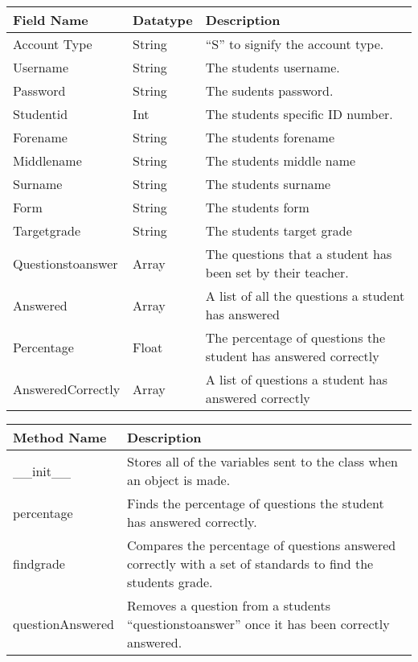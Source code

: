 \documentclass[letterpaper]{article}
\title{}
\author{}
\date{2015-03-30}
\begin{document}
\begin{center}
\tablefirsthead{}
\tablehead{}
\tabletail{}
\tablelasttail{}
\begin{supertabular}{|m{1.8in}|m{1.22956in}|m{2.42956in}|}
\hline
Field Name &
Datatype &
Description\\\hline
Account Type &
String &
{}``S'' to signify the account type.\\\hline
Username &
String &
The students username.\\\hline
Password &
String &
The sudents password.\\\hline
Studentid &
Int &
The students specific ID number.\\\hline
Forename &
String &
The students forename\\\hline
Middlename &
String &
The students middle name\\\hline
Surname &
String &
The students surname \\\hline
Form &
String &
The students form \\\hline
Targetgrade &
String &
The students target grade\\\hline
Questionstoanswer &
Array &
The questions that a student has been set by their teacher.\\\hline
Answered &
Array &
A list of all the questions a student has answered\\\hline
Percentage &
Float &
The percentage of questions the student has answered correctly\\\hline
AnsweredCorrectly &
Array &
A list of questions a student has answered correctly\\\hline
\end{supertabular}
\end{center}

\bigskip


\bigskip


\bigskip


\bigskip

\begin{center}
\tablefirsthead{}
\tablehead{}
\tabletail{}
\tablelasttail{}
\begin{supertabular}{|m{3.38376in}|m{3.38376in}|}
\hline
Method Name &
Description\\\hline
\_\_init\_\_ &
Stores all of the variables sent to the class when an object is made.\\\hline
percentage &
Finds the percentage of questions the student has answered correctly.\\\hline
findgrade &
Compares the percentage of questions answered correctly with a set of standards to find the students grade.\\\hline
questionAnswered &
Removes a question from a students ``questionstoanswer'' once it has been correctly answered.\\\hline
\end{supertabular}
\end{center}

\bigskip
\end{document}
